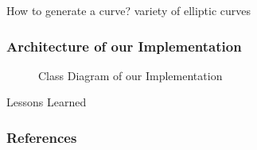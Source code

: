 \documentclass{beamer}
\begin{document}
\begin{frame}{How to generate a curve?}
variety of elliptic curves
\begin{figure}[htp] 
\end{figure}  
\end{frame} 


\begin{frame}
\frametitle{Architecture of our Implementation}
\begin{figure}[htp] 
\caption{Class Diagram of our Implementation}
\end{figure}  
\end{frame}

\begin{frame}{Lessons Learned}
\end{frame} 

\begin{frame}[t,allowframebreaks]
	\frametitle{References}
	\printbibliography
\end{frame}
\end{document}

